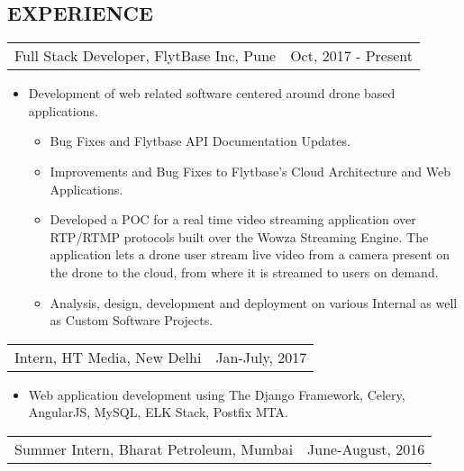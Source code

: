 \documentclass[margin]{res}
\begin{document}
\begin{resume}
\section{EXPERIENCE}      
                  \begin{tabular}{p{3.5in} r} %
                  Full Stack Developer, FlytBase Inc, Pune & Oct, 2017 - Present
                  \end{tabular}	
                   \begin{itemize} %
                    \item[] Development of web related software centered around drone based applications.
                    \begin{itemize}
                      \item Bug Fixes and Flytbase API Documentation Updates.
                      \item Improvements and Bug Fixes to Flytbase's Cloud Architecture and Web Applications.
                      \item Developed a POC for a real time video streaming application over RTP/RTMP protocols built over the Wowza Streaming Engine. The application lets a drone user stream live video from a camera present on the drone to the cloud, from where it is streamed to users on demand.
                      \item Analysis, design, development and deployment on various Internal as well as Custom Software Projects.
                    \end{itemize}
       \end{itemize} 
        \begin{tabular}{p{3.5in} r}
                Intern, HT Media, New Delhi & Jan-July, 2017  
        \end{tabular}	
		  \begin{itemize}
                   \item[] Web application development using The Django Framework, Celery, AngularJS, MySQL, ELK Stack, Postfix MTA. 
                  \end{itemize}
                 \begin{tabular}{p{3.5in} r} %
                  Summer Intern, Bharat Petroleum, Mumbai &  June-August, 2016
                 \end{tabular}
                  \begin{itemize}

\end{itemize}
\end{resume}
\end{document}
